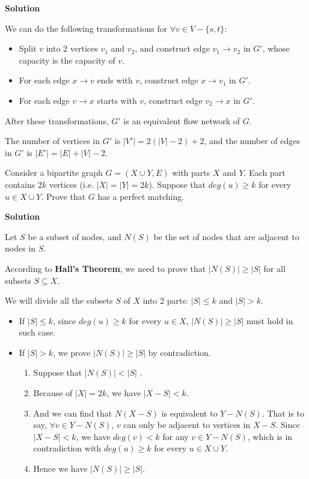 \documentclass{article}
\newcounter{exercise}
\newcommand{\<}{
    \langle}
\renewcommand{\>}{
    \rangle}
\begin{document}
{\bigskip \noindent \textbf{Solution}

We can do the following transformations for $\forall{v \in V - \{s, t\}}$:
\begin{itemize}
    \item Split $v$ into 2 vertices $v_1$ and $v_2$, and construct edge $v_1 \rightarrow v_2$ in $G'$, whose capacity is the capacity of $v$.
    \item For each edge $x \rightarrow v$ ends with $v$, construct edge $x \rightarrow v_1$ in $G'$.
    \item For each edge $v \rightarrow x$ starts with $v$, construct edge $v_2 \rightarrow x$ in $G'$.
\end{itemize}

After these transformations, $G'$ is an equivalent flow network of $G$.

The number of vertices in $G'$ is $|V'| = 2(|V|-2) + 2$, and the number of edges in $G'$ is $|E'| = |E| + |V| - 2$.

\newpage

\begin{exercise}
Consider a bipartite graph $G=(X\cup Y,E)$ with parts $X$ and $Y$. Each part contains $2k$ vertices (i.e. $|X|=|Y|=2k$). Suppose that $deg(u)\geq k$ for every $u\in X\cup Y$. Prove that $G$ has a perfect matching.
\end{exercise}

\bigskip \noindent \textbf{Solution}

Let $S$ be a subset of nodes, and $N(S)$ be the set of nodes that are adjacent to nodes in $S$.

\smallskip

According to \textbf{Hall's Theorem}, we need to prove that $|N(S)| \ge |S|$ for all subsets $S \subseteq X$.

\smallskip

We will divide all the subsets $S$ of $X$ into 2 parts: $|S| \le k$ and $|S| > k$.
\begin{itemize}
    \item If $|S| \le k$, since $deg(u) \ge k$ for every $u \in X$, $|N(S)| \ge |S|$ must hold in such case.
    \item If $|S| > k$, we prove $|N(S)| \ge |S|$ by contradiction.
    \begin{enumerate}[label=\arabic*)]
        \item Suppose that $|N(S)| < |S|$ .
        \item Because of $|X| = 2k$, we have $|X - S| < k$.
        \item And we can find that $N(X-S)$ is equivalent to $Y - N(S)$. That is to say, $\forall{v \in Y - N(S)}$, $v$ can only be adjacent to vertices in $X-S$. Since $|X - S| < k$, we have $deg(v) < k$ for any $v \in Y - N(S)$, which is in contradiction with $deg(u) \ge k$ for every $u \in X \cup Y$.
        \item Hence we have $|N(S)| \ge |S|$.
    \end{enumerate}
\end{itemize}

}
\end{document}
